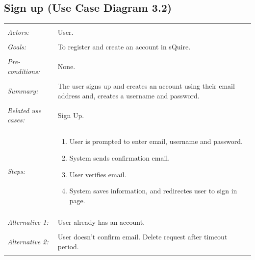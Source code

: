 \documentclass[11pt]{report}
\begin{document}
\subsection{Sign up (Use Case Diagram 3.2)}
    \begin{tabular}{ p{2cm} p{12cm} }
        \hline
        \\
        \textit{Actors:} & User. \\ 
        \\
        \textit{Goals:} & To register and create an account in sQuire. \\
        \\
        \textit{Pre-conditions:} & None. \\
        \\
        \textit{Summary:} & The user signs up and creates an account using their email address and, creates a username and password. \\ 
        \\
        \textit{Related use cases:} & Sign Up. \\ 
        \\
        \textit{Steps:} & \begin{enumerate}
            \item User is prompted to enter email, username and password. 
            \item System sends confirmation email. 
            \item User verifies email. 
            \item System saves information, and redirectes user to sign in page. 
        \end{enumerate} \\
        \\
        \textit{Alternative 1:} & User already has an account. \\ 
        \\
        \textit{Alternative 2:} & User doesn't confirm email. Delete request after timeout period. \\
        \\
        \hline
    \end{tabular}
\end{document}
